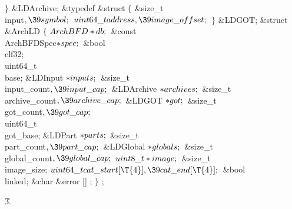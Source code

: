 ${}\}{}$ \&{LDArchive};\6
\&{typedef} \&{struct} ${}\{{}$\1\6
\&{size\_t} \\{input}${},\39\\{symbol};{}$\7
${}\\{uint64\_t}\\{address},\39\\{image\_offset};{}$\2\6
${}\}{}$ \&{LDGOT}; \&{struct} \&{ArchLD} ${}\{$ $\\{ArchBFD}*\\{db};{}$\7
\&{const} \\{ArchBFDSpec}${}{*}\\{spec};{}$\6
\&{bool} \\{elf32};\7
\\{uint64\_t}\\{base};\7
\&{LDInput} ${}{*}\\{inputs};{}$\6
\&{size\_t} \\{input\_count}${},\39\\{input\_cap};{}$\6
\&{LDArchive} ${}{*}\\{archives};{}$\6
\&{size\_t} \\{archive\_count}${},\39\\{archive\_cap};{}$\6
\&{LDGOT} ${}{*}\\{got};{}$\6
\&{size\_t} \\{got\_count}${},\39\\{got\_cap};{}$\7
\\{uint64\_t}\\{got\_base};\7
\&{LDPart} ${}{*}\\{parts};{}$\6
\&{size\_t} \\{part\_count}${},\39\\{part\_cap};{}$\6
\&{LDGlobal} ${}{*}\\{globals};{}$\6
\&{size\_t} \\{global\_count}${},\39\\{global\_cap};{}$\7
${}\\{uint8\_t}*\\{image};{}$\7
\&{size\_t} \\{image\_size};\7
${}\\{uint64\_t}\\{cat\_start}[\T{4}],\39\\{cat\_end}[\T{4}];{}$\7
\&{bool} \\{linked}; \&{char} \6
\&{error} []\1\5
;\2\6
$\}$  ;\par
\U3.\fi


\fi

